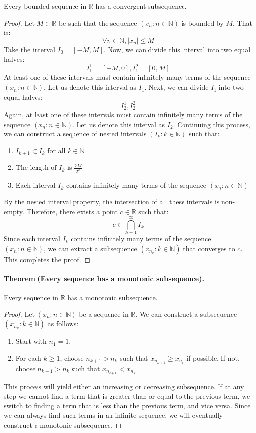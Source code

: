 \documentclass[openany]{book}
\numberwithin{equation}{section}
\begin{document}
    Every bounded sequence in $\mathbb{R}$ has a convergent subsequence.
\par
\begin{proof}
    Let $M \in \mathbb{R}$ be such that the sequence $(x_n : n \in \mathbb{N})$ is bounded by $M$. That is:
    $$\forall n \in \mathbb{N}, |x_n| \leq M$$
    Take the interval $I_0 = [-M, M]$. Now, we can divide this interval into two equal halves:
    $$I_1^1 = [-M, 0], I_1^2 = [0, M]$$
    At least one of these intervals must contain infinitely many terms of the sequence $(x_n : n \in \mathbb{N})$. Let us denote this interval as $I_1$. Next, we can divide $I_1$ into two equal halves:
    $$I_2^1, I_2^2$$
    Again, at least one of these intervals must contain infinitely many terms of the sequence $(x_n : n \in \mathbb{N})$. Let us denote this interval as $I_2$. Continuing this process, we can construct a sequence of nested intervals $(I_k : k \in \mathbb{N})$ such that:
    \begin{enumerate}
        \item $I_{k+1} \subset I_k$ for all $k \in \mathbb{N}$
        \item The length of $I_k$ is $\frac{2M}{2^k}$
        \item Each interval $I_k$ contains infinitely many terms of the sequence $(x_n : n \in \mathbb{N})$
    \end{enumerate}
    By the nested interval property, the intersection of all these intervals is non-empty. Therefore, there exists a point $c \in \mathbb{R}$ such that:
    $$c \in \bigcap_{k=1}^{\infty} I_k$$
    Since each interval $I_k$ contains infinitely many terms of the sequence $(x_n : n \in \mathbb{N})$, we can extract a subsequence $(x_{n_k} : k \in \mathbb{N})$ that converges to $c$. This completes the proof.
\end{proof}
\paragraph{Theorem (Every sequence has a monotonic subsequence).}

    Every sequence in $\mathbb{R}$ has a monotonic subsequence.
\par
\begin{proof}
    Let $(x_n : n \in \mathbb{N})$ be a sequence in $\mathbb{R}$. We can construct a subsequence $(x_{n_k} : k \in \mathbb{N})$ as follows:
    \begin{enumerate}
        \item Start with $n_1 = 1$.
        \item For each $k \geq 1$, choose $n_{k+1} > n_k$ such that $x_{n_{k+1}} \geq x_{n_k}$ if possible. If not, choose $n_{k+1} > n_k$ such that $x_{n_{k+1}} < x_{n_k}$.
    \end{enumerate}
    This process will yield either an increasing or decreasing subsequence. If at any step we cannot find a term that is greater than or equal to the previous term, we switch to finding a term that is less than the previous term, and vice versa. Since we can always find such terms in an infinite sequence, we will eventually construct a monotonic subsequence.
\end{proof}
\end{document}
